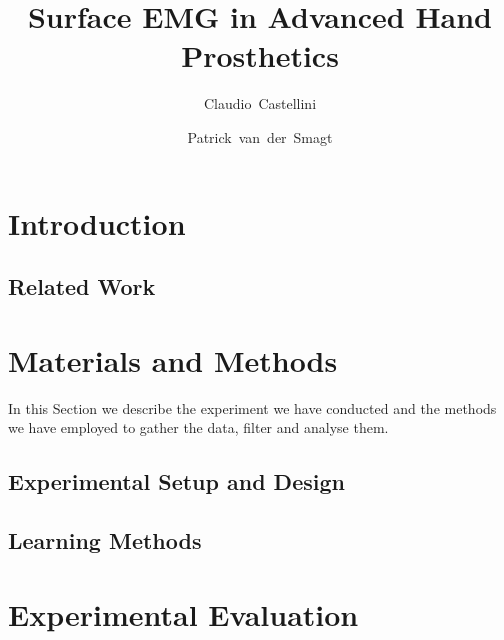 \documentclass[twocolumn,referee]{svjour2}
\begin{document}
\title{Surface EMG in Advanced Hand Prosthetics}

\author{Claudio~Castellini \and Patrick~van~der~Smagt}


\maketitle

\begin{abstract}
  
\end{abstract}




\section{Introduction}
\label{sec:introduction}


\subsection{Related Work}
\label{subsec:relatedwork}


\section{Materials and Methods}
\label{sec:m&ms}

In this Section we describe the experiment we have conducted and the
methods we have employed to gather the data, filter and analyse them.

\subsection{Experimental Setup and Design}
\label{subsec:setup}


\subsection{Learning Methods}
\label{subsec:analysis}


\section{Experimental Evaluation}
\label{sec:exp}
\end{document}
